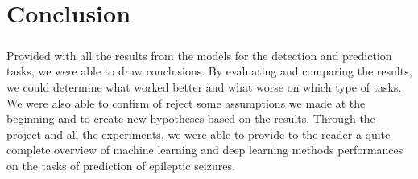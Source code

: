 
\chapter{Conclusion} \label{chap: conclusion}

\paragraph{} Provided with all the results from the models for the detection and prediction tasks, we were able to draw conclusions. By evaluating and comparing the results, we could determine what worked better and what worse on which type of tasks. We were also able to confirm of reject some assumptions we made at the beginning and to create new hypotheses based on the results. Through the project and all the experiments, we were able to provide to the reader a quite complete overview of machine learning and deep learning methods performances on the tasks of prediction of epileptic seizures.